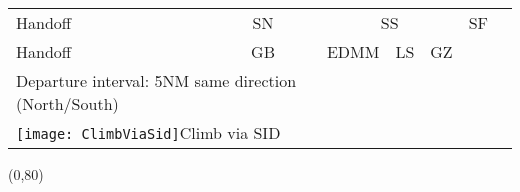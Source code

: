 \documentclass[10pt,landscape,a4paper]{article}
\newcommand{\x}{\texttt{[image: ClimbViaSid]}}
\begin{document}
\begin{textblock}{30}
\begin{table}
\begin{tabular}{|l|c|c|c|c|c|c|c||c|c|c|c|c|c|l|}
\multicolumn{2}{|l}{Handoff} & \multicolumn{6}{c||}{SN} & \multicolumn{4}{c|}{SS} & \multicolumn{2}{c|}{SF} \\ \cline{0-13}
\multicolumn{2}{|l}{Handoff} & \multicolumn{6}{c||}{GB} & \multicolumn{2}{c|}{EDMM} & LS & GZ & \multicolumn{2}{c}{} \\ \cline{0-11}
\multicolumn{8}{l}{Departure interval: 5NM same direction (North/South)} \\
\multicolumn{8}{l}{\x \color{red}Climb via SID} \\
\end{tabular}
\end{table}
\end{textblock}



\begin{textblock}{10}(0,80)
\begin{table}[]
\begin{tabular}{|l|l|l|l|l|}


\end{tabular}
\end{table}
\end{textblock}
\end{document}
